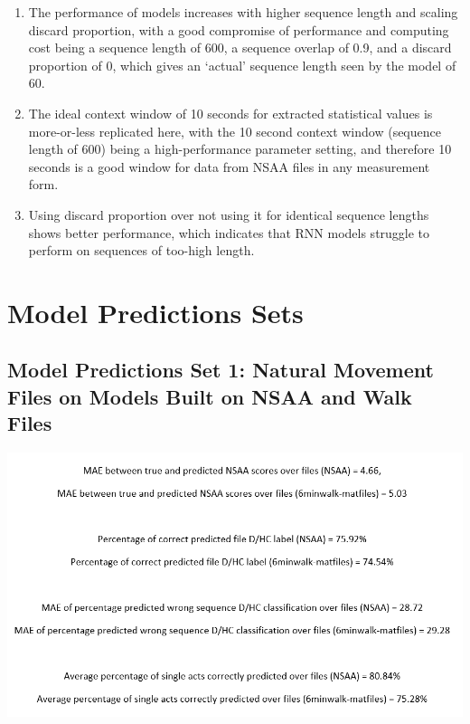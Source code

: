 \documentclass[12pt,twoside]{report}
\begin{document}
\begin{enumerate}
	\item The performance of models increases with higher sequence length and scaling discard proportion, with a good compromise of performance and computing cost being a sequence length of 600, a sequence overlap of 0.9, and a discard proportion of 0, which gives an ‘actual’ sequence length seen by the model of 60.
	\item The ideal context window of 10 seconds for extracted statistical values is more-or-less replicated here, with the 10 second context window (sequence length of 600) being a high-performance parameter setting, and therefore 10 seconds is a good window for data from NSAA files in any measurement form.
	\item Using discard proportion over not using it for identical sequence lengths shows better performance, which indicates that RNN models struggle to perform on sequences of too-high length.
\end{enumerate}











\chapter{Model Predictions Sets\\}



\section{Model Predictions Set 1: Natural Movement Files on Models Built on NSAA and Walk Files}

\begin{center}
\includegraphics[scale=0.5]{project_figures/fig11_1}
\end{center}
\end{document}
